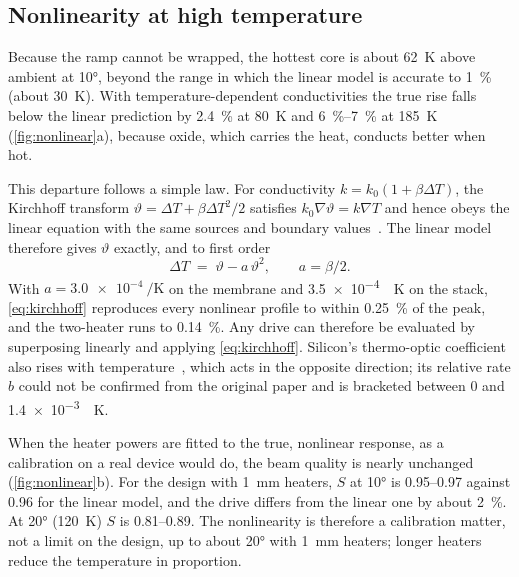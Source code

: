 \subsection{Nonlinearity at high temperature}
\label{sec:nonlinear}

Because the ramp cannot be wrapped, the hottest core is about \qty{62}{\kelvin} above ambient at \ang{10}, beyond the
range in which the linear model is accurate to \qty{1}{\percent} (about \qty{30}{\kelvin}). With temperature-dependent
conductivities the true rise falls below the linear prediction by \qty{2.4}{\percent} at \qty{80}{\kelvin} and
\qtyrange{6}{7}{\percent} at \qty{185}{\kelvin} (\cref{fig:nonlinear}a), because oxide, which carries the heat,
conducts better when hot.

This departure follows a simple law. For conductivity $k=k_0(1+\beta\Delta T)$, the Kirchhoff transform
$\vartheta=\Delta T+\beta\Delta T^2/2$ satisfies $k_0\nabla\vartheta=k\nabla T$ and hence obeys the linear equation with
the same sources and boundary values~\cite{carslaw1959}. The linear model therefore gives $\vartheta$ exactly, and to
first order
\begin{equation}
  \Delta T \;=\; \vartheta - a\,\vartheta^{2}, \qquad a=\beta/2 .
  \label{eq:kirchhoff}
\end{equation}
With $a=\qty{3.0e-4}{\per\kelvin}$ on the membrane and \qty{3.5e-4}{\per\kelvin} on the  stack,
\cref{eq:kirchhoff} reproduces every nonlinear profile to within \qty{0.25}{\percent} of the peak, and the two-heater
runs to \qty{0.14}{\percent}. Any drive can therefore be evaluated by superposing linearly and applying
\cref{eq:kirchhoff}. Silicon's thermo-optic coefficient also rises with temperature~\cite{cocorullo1999}, which acts in
the opposite direction; its relative rate $b$ could not be confirmed from the original paper and is bracketed between
0 and \qty{1.4e-3}{\per\kelvin}.

When the heater powers are fitted to the true, nonlinear response, as a calibration on a real device would do, the
beam quality is nearly unchanged (\cref{fig:nonlinear}b). For the  design with \qty{1}{\milli\metre}
heaters, $S$ at \ang{10} is \numrange{0.95}{0.97} against \num{0.96} for the linear model, and the drive differs from
the linear one by about \qty{2}{\percent}. At \ang{20} (\qty{120}{\kelvin}) $S$ is \numrange{0.81}{0.89}. The
nonlinearity is therefore a calibration matter, not a limit on the design, up to about \ang{20} with
\qty{1}{\milli\metre} heaters; longer heaters reduce the temperature in proportion.

